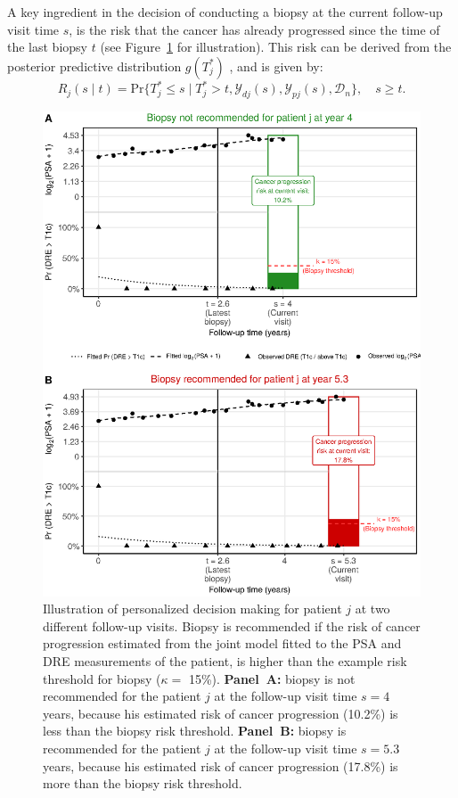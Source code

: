 A key ingredient in the decision of conducting a biopsy at the current follow-up visit time $s$, is the risk that the cancer has already progressed since the time of the last biopsy $t$ (see Figure~\ref{fig:dynRiskPlot_2340} for illustration). This risk can be derived from the posterior predictive distribution $g(T^*_j)$ \cite{rizopoulos2011dynamic}, and is given by:
\begin{equation*}
\label{eq:dynamic_risk_prob}
R_j(s \mid t) = \mbox{Pr}\big\{T^*_j \leq s \mid T^*_j > t, \mathcal{Y}_{dj}(s), \mathcal{Y}_{pj}(s), \mathcal{D}_n\big\}, \quad s \geq t.
\end{equation*}
\begin{figure}[!htb]
\captionsetup{justification=justified}
\centerline{\includegraphics[width=\columnwidth]{images/dynRiskPlot_2340.eps}}
\caption{Illustration of personalized decision making for patient $j$ at two different follow-up visits. Biopsy is recommended if the risk of cancer progression estimated from the joint model fitted to the PSA and DRE measurements of the patient, is higher than the example risk threshold for biopsy ($\kappa=$ 15\%). \textbf{Panel~A:} biopsy is not recommended for the patient $j$ at the follow-up visit time $s=4$ years, because his estimated risk of cancer progression (10.2\%) is less than the biopsy risk threshold. \textbf{Panel~B:} biopsy is recommended for the patient $j$ at the follow-up visit time $s=5.3$ years, because his estimated risk of cancer progression (17.8\%) is more than the biopsy risk threshold.}
\label{fig:dynRiskPlot_2340}
\end{figure}
